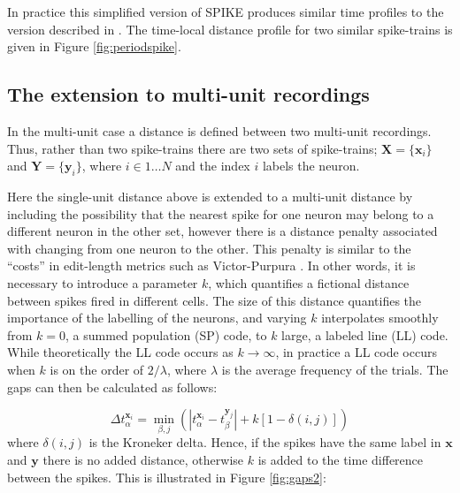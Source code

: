 \documentclass[12pt]{amsart}
\begin{document}
In practice this simplified version of SPIKE produces similar time profiles to the version described in \cite{Kreuzetal2007}.  The time-local distance profile for two similar spike-trains is given in Figure \ref{fig:periodspike}.

%


\subsection{The extension to multi-unit recordings}

In the multi-unit case a distance is defined between two multi-unit recordings.  Thus, rather than two spike-trains there are two sets of spike-trains; $\mathbf{X}=\{ \mathbf{x}_i \}$ and $ \mathbf{Y}=\{ \mathbf{y}_i \}$, where $i \in 1\ldots N$ and the index $i$ labels the neuron.

Here the single-unit distance above is extended to a multi-unit distance by including the possibility that the nearest spike for one neuron may belong to a different neuron in the other set, however there is a distance penalty associated with changing from one neuron to the other. This penalty is similar to the ``costs'' in edit-length metrics such as Victor-Purpura \cite{VictorPurpura1997}. In other words, it is necessary to introduce a parameter $k$, which quantifies a fictional distance between spikes fired in different cells.  The size of this distance quantifies the importance of the labelling of the neurons, and varying $k$ interpolates smoothly from $k=0$, a summed population (SP) code, to $k$ large, a labeled line  (LL) code.  While theoretically the LL code occurs as $k \rightarrow \infty$, in practice a LL code occurs when $k$ is on the order of $2/\lambda$, where $\lambda$ is the average frequency of the trials.   The gaps can then be calculated as follows:

\begin{equation}
\Delta t_{\alpha}^{\mathbf{x}_i} = \min_{\beta,j} \left( |t_{\alpha}^{\mathbf{x}_i} - t_{\beta}^{\mathbf{y}_j} | + k\left[1-\delta(i,j)\right] \right)
\end{equation}
where $\delta(i,j)$ is the Kroneker delta. Hence, if the spikes have the same label in $\mathbf{x}$ and $\mathbf{y}$ there is no added distance, otherwise $k$ is added to the time difference between the spikes.  This is illustrated in Figure \ref{fig:gaps2}:
\end{document}
